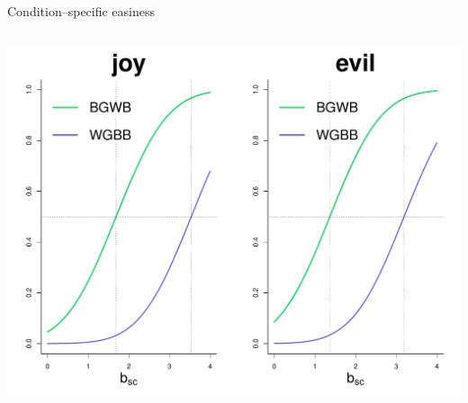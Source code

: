 \documentclass[compress]{beamer}
\begin{document}
\begin{frame}{Condition--specific easiness}
	
	\vspace{7mm}
	\begin{columns}
		
		
		\vspace{5mm}
		\includegraphics[width=\textwidth]{img/RaceHigh.pdf}
		
		

\end{columns}
\end{frame}
\end{document}
